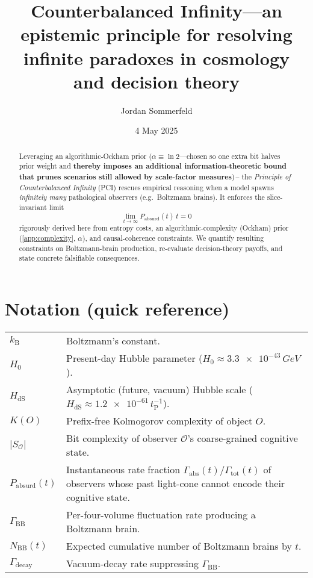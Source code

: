 \documentclass[12pt]{article}
\title{Counterbalanced Infinity---an epistemic principle for resolving infinite paradoxes in cosmology and decision theory}
\author{Jordan Sommerfeld}
\date{4 May 2025}
\newcommand{\KB}{k_\mathrm{B}}
\newcommand{\PCI}{PCI\xspace}
\begin{document}
\raggedbottom
\maketitle

\begin{abstract}\noindent
Leveraging an algorithmic‐Ockham prior
($\alpha\equiv\ln 2$—chosen so one extra bit halves prior weight and \textbf{thereby imposes an additional information-theoretic bound that prunes scenarios still allowed by scale-factor measures})\,– the \emph{Principle of Counterbalanced Infinity} (\PCI) rescues empirical
reasoning when a model spawns \emph{infinitely many} pathological observers (e.g.\ Boltzmann brains). It enforces the slice-invariant limit
\[
   \lim_{t\to\infty} P_{\text{absurd}}(t)\,t = 0
   \tag*{\PCI Limit}\label{eq:PCI-limit}
\]
rigorously derived here from entropy costs, an algorithmic-complexity (Ockham) prior
(\autoref{app:complexity}, $\alpha$), and causal-coherence constraints. We quantify resulting constraints on Boltzmann-brain production,
re-evaluate decision-theory payoffs, and state concrete falsifiable consequences.
\end{abstract}

\section*{Notation (quick reference)}
\renewcommand{\arraystretch}{1.4}
\begin{tabular}{@{}p{3.3cm}p{10cm}@{}}
$\KB$ & Boltzmann’s constant.\\
$H_0$ & Present-day Hubble parameter ($H_0\!\approx\!\num{3.3e-43}\,\si{GeV}$).\\
$H_{\mathrm{dS}}$ & Asymptotic (future, vacuum) Hubble scale
($H_{\mathrm{dS}}\!\approx\!\num{1.2e-61}\,t_{\mathrm P}^{-1}$).\\
$K(O)$ & Prefix-free Kolmogorov complexity of object $O.$\\
$\lvert S_{\mathcal O}\rvert$ & Bit complexity of observer $\mathcal O$’s coarse-grained cognitive state.\\
$P_{\text{absurd}}(t)$ & Instantaneous rate fraction $\Gamma_{\text{abs}}(t)/\Gamma_{\text{tot}}(t)$ of observers whose past light-cone cannot encode their cognitive state.\\
$\Gamma_{\text{BB}}$ & Per-four-volume fluctuation rate producing a Boltzmann brain.\\
$N_{\text{BB}}(t)$ & Expected cumulative number of Boltzmann brains by $t.$\\
$\Gamma_{\text{decay}}$ & Vacuum-decay rate suppressing $\Gamma_{\text{BB}}.$\\
\end{tabular}
\end{document}
